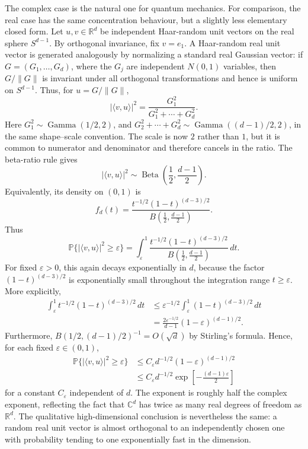\documentclass[aps,pra,reprint,superscriptaddress,nofootinbib,longbibliography]{revtex4-2}
\newcommand{\eps}{\varepsilon}
\newcommand{\PP}{\mathbb{P}}
\begin{document}
The complex case is the natural one for quantum mechanics.  For comparison,
the real case has the same concentration behaviour, but a slightly less
elementary closed form.  Let $u,v\in\mathbb R^d$ be independent Haar-random
unit vectors on the real sphere $S^{d-1}$.  By orthogonal invariance, fix
$v=e_1$.  A Haar-random real unit vector is generated analogously by
normalizing a standard real Gaussian vector: if $G=(G_1,\ldots,G_d)$, where
the $G_j$ are independent $N(0,1)$ variables, then $G/\|G\|$ is invariant
under all orthogonal transformations and hence is uniform on $S^{d-1}$. Thus,
for $u=G/\|G\|$,
\begin{equation}
    |\langle v,u\rangle|^2
    =
    \frac{G_1^2}{G_1^2+\cdots+G_d^2} .
\end{equation}
Here $G_1^2\sim\operatorname{Gamma}(1/2,2)$, and
$G_2^2+\cdots+G_d^2\sim\operatorname{Gamma}((d-1)/2,2)$, in the same
shape--scale convention.  The scale is now $2$ rather than $1$, but it is
common to numerator and denominator and therefore cancels in the ratio.  The
beta-ratio rule gives
\begin{equation}
    |\langle v,u\rangle|^2
    \sim
    \operatorname{Beta}\left(\frac12,\frac{d-1}{2}\right).
    \label{eq:real-beta-distribution}
\end{equation}
Equivalently, its density on $(0,1)$ is
\begin{equation}
    f_d(t)
    =
    \frac{t^{-1/2}(1-t)^{(d-3)/2}}
         {B\left(\frac12,\frac{d-1}{2}\right)} .
    \label{eq:real-beta-density}
\end{equation}
Thus
\begin{equation}
    \PP\{|\langle v,u\rangle|^2\geq\eps\}
    =
    \int_\eps^1
    \frac{t^{-1/2}(1-t)^{(d-3)/2}}
         {B\left(\frac12,\frac{d-1}{2}\right)}\,dt .
    \label{eq:real-tail-integral}
\end{equation}
For fixed $\eps>0$, this again decays exponentially in $d$, because the factor
$(1-t)^{(d-3)/2}$ is exponentially small throughout the integration range
$t\geq\eps$. More explicitly,
\begin{align}
 \int_\eps^1 t^{-1/2}(1-t)^{(d-3)/2}\,dt
 &\leq
 \eps^{-1/2}
 \int_\eps^1 (1-t)^{(d-3)/2}\,dt
 \nonumber\\
 &=
 \frac{2\eps^{-1/2}}{d-1}
 (1-\eps)^{(d-1)/2} .
\end{align}
Furthermore, $B(1/2,(d-1)/2)^{-1}=O(\sqrt d)$ by Stirling's formula. Hence,
for each fixed $\eps\in(0,1)$,
\begin{align}
    \PP\{|\langle v,u\rangle|^2\geq\eps\}
    &\leq
    C_\eps d^{-1/2}(1-\eps)^{(d-1)/2}
    \nonumber\\
    &\leq
    C_\eps d^{-1/2}
    \exp\left[-\frac{(d-1)\eps}{2}\right]
\end{align}
for a constant $C_\eps$ independent of $d$.  The exponent is roughly half the
complex exponent, reflecting the fact that $\mathbb C^d$ has twice as many
real degrees of freedom as $\mathbb R^d$.  The qualitative high-dimensional
conclusion is nevertheless the same: a random real unit vector is almost
orthogonal to an independently chosen one with probability tending to one
exponentially fast in the dimension.
\end{document}
